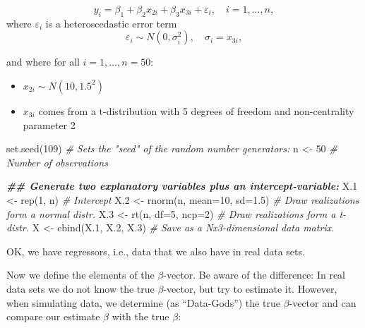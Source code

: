 \documentclass[
]{book}
\newenvironment{Shaded}{\begin{snugshade}}{\end{snugshade}}
\newcommand{\AttributeTok}[1]{\textcolor[rgb]{0.77,0.63,0.00}{#1}}
\newcommand{\CommentTok}[1]{\textcolor[rgb]{0.56,0.35,0.01}{\textit{#1}}}
\newcommand{\DecValTok}[1]{\textcolor[rgb]{0.00,0.00,0.81}{#1}}
\newcommand{\DocumentationTok}[1]{\textcolor[rgb]{0.56,0.35,0.01}{\textbf{\textit{#1}}}}
\newcommand{\FloatTok}[1]{\textcolor[rgb]{0.00,0.00,0.81}{#1}}
\newcommand{\FunctionTok}[1]{\textcolor[rgb]{0.00,0.00,0.00}{#1}}
\newcommand{\NormalTok}[1]{#1}
\newcommand{\OtherTok}[1]{\textcolor[rgb]{0.56,0.35,0.01}{#1}}
\providecommand{\tightlist}{%
  \setlength{\itemsep}{0pt}\setlength{\parskip}{0pt}}
\begin{document}
\[y_i=\beta_1 +\beta_2 x_{2i}+\beta_3 x_{3i}+\varepsilon_{i},\quad i=1,\dots,n,\]
where \(\varepsilon_{i}\) is a heteroscedastic error term
\[\varepsilon_{i}\sim N(0,\sigma_i^2),\quad \sigma_i=x_{3i},\]

and where for all \(i=1,\dots,n=50\):

\begin{itemize}
\tightlist
\item
  \(x_{2i}\sim N(10,1.5^2)\)
\item
  \(x_{3i}\) comes from a t-distribution with 5 degrees of freedom and non-centrality parameter 2
\end{itemize}

\begin{Shaded}
\begin{Highlighting}[]
\FunctionTok{set.seed}\NormalTok{(}\DecValTok{109}\NormalTok{) }\CommentTok{\# Sets the "seed" of the random number generators:}
\NormalTok{n   }\OtherTok{\textless{}{-}} \DecValTok{50}     \CommentTok{\# Number of observations}

\DocumentationTok{\#\# Generate two explanatory variables plus an intercept{-}variable:}
\NormalTok{X}\FloatTok{.1} \OtherTok{\textless{}{-}} \FunctionTok{rep}\NormalTok{(}\DecValTok{1}\NormalTok{, n)                 }\CommentTok{\# Intercept}
\NormalTok{X}\FloatTok{.2} \OtherTok{\textless{}{-}} \FunctionTok{rnorm}\NormalTok{(n, }\AttributeTok{mean=}\DecValTok{10}\NormalTok{, }\AttributeTok{sd=}\FloatTok{1.5}\NormalTok{) }\CommentTok{\# Draw realizations form a normal distr.}
\NormalTok{X}\FloatTok{.3} \OtherTok{\textless{}{-}} \FunctionTok{rt}\NormalTok{(n, }\AttributeTok{df=}\DecValTok{5}\NormalTok{, }\AttributeTok{ncp=}\DecValTok{2}\NormalTok{)        }\CommentTok{\# Draw realizations form a t{-}distr.}
\NormalTok{X   }\OtherTok{\textless{}{-}} \FunctionTok{cbind}\NormalTok{(X}\FloatTok{.1}\NormalTok{, X}\FloatTok{.2}\NormalTok{, X}\FloatTok{.3}\NormalTok{)      }\CommentTok{\# Save as a Nx3{-}dimensional data matrix.}
\end{Highlighting}
\end{Shaded}

OK, we have regressors, i.e., data that we also have in real data sets.

Now we define the elements of the \(\beta\)-vector. Be aware of the difference: In real data sets we do not know the true \(\beta\)-vector, but try to estimate it. However, when simulating data, we determine (as ``Data-Gods'') the true \(\beta\)-vector and can compare our estimate \(\hat{\beta}\) with the true \(\beta\):
\end{document}

